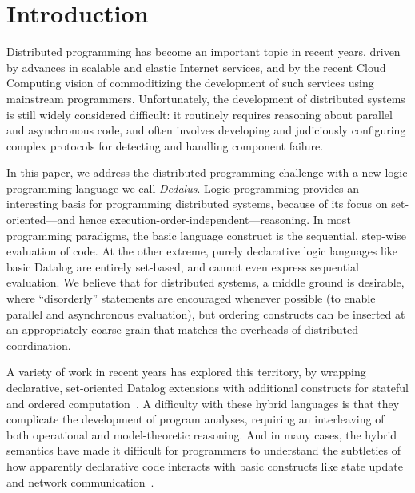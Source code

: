 \section{Introduction}
Distributed programming has become an important topic in recent years, driven by advances in scalable and elastic Internet services, and by the recent Cloud Computing vision of commoditizing the development of such services using mainstream programmers.  Unfortunately, the development of distributed systems is still widely considered difficult: it routinely requires reasoning about parallel and asynchronous code, and often involves developing and judiciously configuring complex protocols for detecting and handling component failure.

In this paper, we address the distributed programming challenge with a new logic programming language we call {\em Dedalus}.  Logic programming provides an interesting basis for programming distributed systems, because of its focus on set-oriented---and hence execution-order-independent---reasoning.  In most programming paradigms, the basic language construct is the sequential, step-wise evaluation of code. At the other extreme, purely declarative logic languages like basic Datalog are entirely set-based, and cannot even express sequential evaluation.  We believe that for distributed systems, a middle ground is desirable, where ``disorderly'' statements are encouraged whenever possible (to enable parallel and asynchronous evaluation), but ordering constructs can be inserted at an appropriately coarse grain that matches the overheads of distributed coordination.

A variety of work in recent years has explored this territory, by wrapping declarative, set-oriented Datalog extensions with additional constructs for stateful and ordered computation~\cite{overlog,reactors,meld,prolog-events-gui,etc}.  A difficulty with these hybrid languages is that they complicate the development of program analyses, requiring an interleaving of both operational and model-theoretic reasoning.  And in many cases, the hybrid semantics have made it difficult for programmers to understand the subtleties of how apparently declarative code interacts with basic constructs like state update and network communication~\cite{overlogkvetches}.

